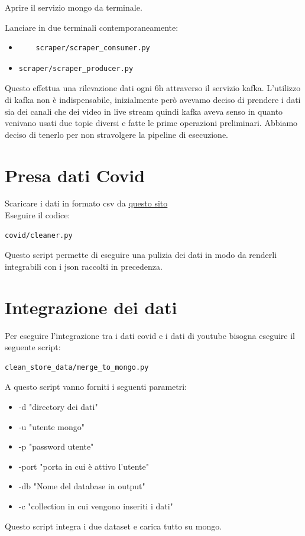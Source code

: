 \documentclass[10pt, a4paper,openany]{article}
\begin{document}
Aprire il servizio mongo da terminale.


Lanciare in due terminali contemporaneamente: 

\begin{itemize}
	\item \begin{verbatim}
	scraper/scraper_consumer.py
	\end{verbatim}
	\item \begin{verbatim}
scraper/scraper_producer.py
	\end{verbatim}
\end{itemize}

Questo effettua una rilevazione dati ogni 6h attraverso il servizio kafka. L'utilizzo di kafka non è indispensabile, inizialmente però avevamo deciso di prendere i dati sia dei canali che dei video in live stream quindi kafka aveva senso in quanto venivano usati due topic diversi e fatte le prime operazioni preliminari. Abbiamo deciso di tenerlo per non stravolgere la pipeline di esecuzione.

\section*{Presa dati Covid}

Scaricare i dati in formato csv da \href{https://ourworldindata.org/coronavirus-testing}{questo sito}
\\Eseguire il codice:

\begin{verbatim}
covid/cleaner.py
\end{verbatim}
Questo script permette di eseguire una pulizia dei dati in modo da renderli integrabili con i json raccolti in precedenza.


\section*{Integrazione dei dati}


Per eseguire l'integrazione tra i dati covid e i dati di youtube bisogna eseguire il seguente script:

\begin{verbatim}
clean_store_data/merge_to_mongo.py
\end{verbatim}
A questo script vanno forniti i seguenti parametri:

\begin{itemize}
	\item -d "directory dei dati"
	\item -u "utente mongo"
	\item -p "password utente"
	\item -port "porta in cui è attivo l'utente"
	\item-db "Nome del database in output"
	\item -c "collection in cui vengono inseriti i dati"
\end{itemize}
Questo script integra i due dataset e carica tutto su mongo.
\end{document}
